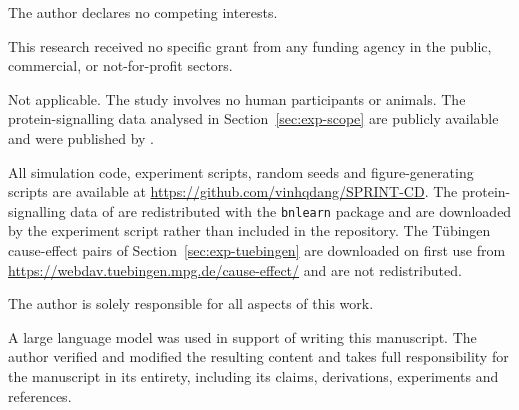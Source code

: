 
 The author declares no competing interests.

 This research received no specific grant from any funding
agency in the public, commercial, or not-for-profit sectors.

 Not applicable. The study involves no human
participants or animals. The protein-signalling data analysed in
Section~\ref{sec:exp-scope} are publicly available and were published by
\citet{sachs2005causal}.

 All simulation code, experiment scripts,
random seeds and figure-generating scripts are available at
\url{https://github.com/vinhqdang/SPRINT-CD}. The protein-signalling data of
\citet{sachs2005causal} are redistributed with the \texttt{bnlearn} package
\citep{scutari2010learning} and are downloaded by the experiment script rather
than included in the repository. The Tübingen cause-effect pairs of
Section~\ref{sec:exp-tuebingen} are downloaded on first use from
\url{https://webdav.tuebingen.mpg.de/cause-effect/} and are not redistributed.

 The author is solely responsible for all aspects
of this work.

 A large language model was used in support of
writing this manuscript. The author verified and modified the resulting
content and takes full responsibility for the manuscript in its entirety,
including its claims, derivations, experiments and references.
